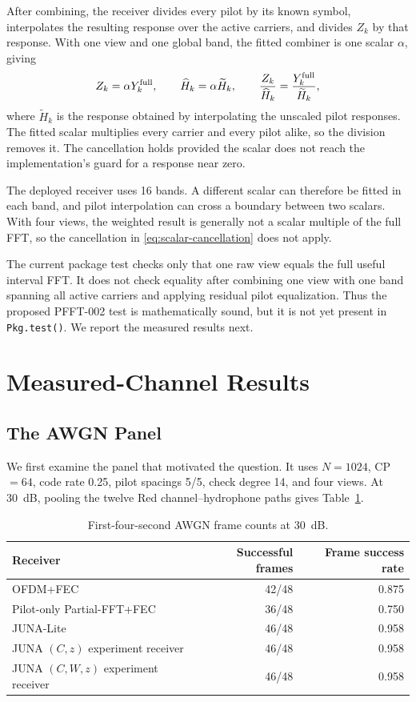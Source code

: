 \documentclass[11pt]{article}
\begin{document}
After combining, the receiver divides every pilot by its known symbol,
interpolates the resulting response over the active carriers, and divides
$Z_k$ by that response.  With one view and one global band, the fitted
combiner is one scalar $\alpha$, giving
\begin{equation}
  Z_k=\alpha Y_k^{\rm full},
  \qquad
  \widehat H_k=\alpha\widetilde H_k,
  \qquad
  \frac{Z_k}{\widehat H_k}
  =
  \frac{Y_k^{\rm full}}{\widetilde H_k},
  \label{eq:scalar-cancellation}
\end{equation}
where $\widetilde H_k$ is the response obtained by interpolating the unscaled
pilot responses.  The fitted scalar multiplies every carrier and every pilot
alike, so the division removes it.  The cancellation holds provided the
scalar does not reach the implementation's guard for a response near zero.

The deployed receiver uses 16 bands.  A different scalar can therefore be
fitted in each band, and pilot interpolation can cross a boundary between two
scalars.  With four views, the weighted result is generally not a scalar
multiple of the full FFT, so the cancellation in
\eqref{eq:scalar-cancellation} does not apply.

The current package test checks only that one raw view equals the full useful
interval FFT.  It does not check equality after combining one view with one
band spanning all active carriers and applying residual pilot equalization.
Thus the proposed PFFT-002 test is mathematically sound, but it is not yet
present in \texttt{Pkg.test()}.  We report the measured results next.

\section{Measured-Channel Results}

\subsection{The AWGN Panel}

We first examine the panel that motivated the question.  It uses $N=1024$,
CP$=64$, code rate 0.25, pilot spacings 5/5, check degree 14, and four views.
At 30~dB, pooling the twelve Red channel--hydrophone paths gives
Table~\ref{tab:awgn}.

\begin{table}[ht]
\centering
\caption{First-four-second AWGN frame counts at 30~dB.}
\label{tab:awgn}
\begin{tabular}{@{}lrr@{}}
\toprule
Receiver & Successful frames & Frame success rate \\
\midrule
OFDM+FEC & 42/48 & 0.875 \\
Pilot-only Partial-FFT+FEC & 36/48 & 0.750 \\
JUNA-Lite & 46/48 & 0.958 \\
JUNA $(C,z)$ experiment receiver & 46/48 & 0.958 \\
JUNA $(C,W,z)$ experiment receiver & 46/48 & 0.958 \\
\bottomrule
\end{tabular}
\end{table}
\end{document}
